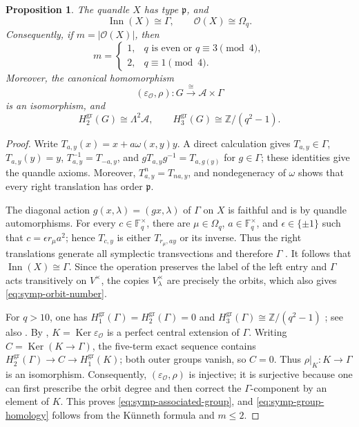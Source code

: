 \documentclass[10pt,a4paper]{amsart}
\newtheorem{proposition}[theorem]{Proposition}
\DeclareMathOperator{\Inn}{Inn}
\DeclareMathOperator{\Ker}{Ker}
\newcommand{\ZZ}{\mathbb Z}
\newcommand{\OO}{\mathcal O}
\newcommand{\gr}{\mathrm{gr}}
\begin{document}
\begin{proposition}
\label{prop:symp-associated-group}
The quandle $X$ has type $\mathfrak p$, and
\[
 \Inn(X)\cong\Gamma,
 \qquad
 \OO(X)\cong\Omega_q.
\]
Consequently, if $m=|\OO(X)|$, then
\begin{equation}
 m=
 \begin{cases}
 1,&q\text{ is even or }q\equiv3\pmod4,\\
 2,&q\equiv1\pmod4.
 \end{cases}
\label{eq:symp-orbit-number}
\end{equation}
Moreover, the canonical homomorphism
\begin{equation}
 (\varepsilon_{\OO},\rho)\colon
 G\xrightarrow{\cong}\mathcal A\times\Gamma
\label{eq:symp-associated-group}
\end{equation}
is an isomorphism, and
\begin{equation}
 H_2^{\gr}(G)\cong\Lambda^2\mathcal A,
 \qquad
 H_3^{\gr}(G)\cong\ZZ/(q^2-1).
\label{eq:symp-group-homology}
\end{equation}
\end{proposition}

\begin{proof}
Write $T_{a,y}(x)=x+a\omega(x,y)y$. A direct calculation gives
$T_{a,y}\in\Gamma$, $T_{a,y}(y)=y$, $T_{a,y}^{-1}=T_{-a,y}$, and
$gT_{a,y}g^{-1}=T_{a,g(y)}$ for $g\in\Gamma$; these identities give the
quandle axioms. Moreover, $T_{a,y}^n=T_{na,y}$, and nondegeneracy of
$\omega$ shows that every right translation has order $\mathfrak p$.

The diagonal action $g(x,\lambda)=(gx,\lambda)$ of $\Gamma$ on $X$ is
faithful and is by quandle automorphisms. For every
$c\in\mathbb F_q^\times$, there are $\mu\in\Omega_q$,
$a\in\mathbb F_q^\times$, and $\epsilon\in\{\pm1\}$ such that
$c=\epsilon r_\mu a^2$; hence $T_{c,y}$ is either $T_{r_\mu,ay}$ or its
inverse. Thus the right translations generate all symplectic transvections
and therefore $\Gamma$ \cite[Lemma~4.3]{NosakaAdjoint}. It follows that
$\Inn(X)\cong\Gamma$. Since the operation preserves the label of the left
entry and $\Gamma$ acts transitively on $V^\times$, the copies
$V_\lambda^\times$ are precisely the orbits, which also gives
\eqref{eq:symp-orbit-number}.

For $q>10$, one has
$H_1^{\gr}(\Gamma)=H_2^{\gr}(\Gamma)=0$ and
$H_3^{\gr}(\Gamma)\cong\ZZ/(q^2-1)$
\cite[Proposition~4.6 and its proof]{NosakaAdjoint}; see also
\cite{FiedorowiczPriddy,Friedlander}. By
\cite[Proposition~3.3]{NosakaAdjoint},
$K=\Ker\varepsilon_{\OO}$ is a perfect central extension of $\Gamma$.
Writing $C=\Ker(K\to\Gamma)$, the five-term exact sequence contains
$H_2^{\gr}(\Gamma)\to C\to H_1^{\gr}(K)$; both outer groups vanish, so
$C=0$. Thus $\rho|_K\colon K\to\Gamma$ is an isomorphism. Consequently,
$(\varepsilon_{\OO},\rho)$ is injective; it is surjective because one can
first prescribe the orbit degree and then correct the $\Gamma$-component by
an element of $K$. This proves \eqref{eq:symp-associated-group}, and
\eqref{eq:symp-group-homology} follows from the K\"unneth formula and
$m\le2$.
\end{proof}
\end{document}
